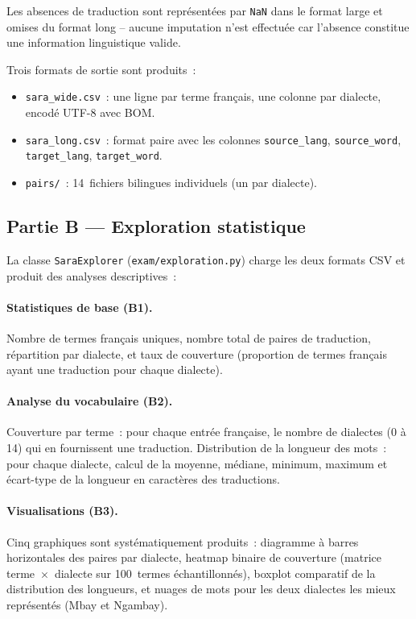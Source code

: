 \documentclass[11pt, a4paper, oneside]{article}
\begin{document}
Les absences de traduction sont représentées par \texttt{NaN} dans le format large et omises du format long -- aucune imputation n'est effectuée car l'absence constitue une information linguistique valide.

Trois formats de sortie sont produits~:
\begin{itemize}[noitemsep]
  \item \texttt{sara\_wide.csv}~: une ligne par terme français, une colonne par dialecte, encodé UTF-8 avec BOM.
  \item \texttt{sara\_long.csv}~: format paire avec les colonnes \texttt{source\_lang}, \texttt{source\_word}, \texttt{target\_lang}, \texttt{target\_word}.
  \item \texttt{pairs/}~: 14~fichiers bilingues individuels (un par dialecte).
\end{itemize}

\subsection{Partie B — Exploration statistique}

La classe \texttt{SaraExplorer} (\texttt{exam/exploration.py}) charge les deux formats CSV et produit des analyses descriptives~:

\paragraph{Statistiques de base (B1).} Nombre de termes français uniques, nombre total de paires de traduction, répartition par dialecte, et taux de couverture (proportion de termes français ayant une traduction pour chaque dialecte).

\paragraph{Analyse du vocabulaire (B2).} Couverture par terme~: pour chaque entrée française, le nombre de dialectes (0 à 14) qui en fournissent une traduction. Distribution de la longueur des mots~: pour chaque dialecte, calcul de la moyenne, médiane, minimum, maximum et écart-type de la longueur en caractères des traductions.

\paragraph{Visualisations (B3).} Cinq graphiques sont systématiquement produits~: diagramme à barres horizontales des paires par dialecte, heatmap binaire de couverture (matrice terme~$\times$~dialecte sur 100~termes échantillonnés), boxplot comparatif de la distribution des longueurs, et nuages de mots pour les deux dialectes les mieux représentés (Mbay et Ngambay).
\end{document}

